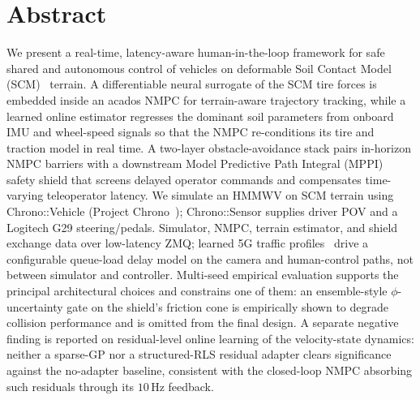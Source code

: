 \documentclass{acmd2026_abstract}
\begin{document}
\section*{Abstract}
We present a real-time, latency-aware human-in-the-loop framework
for safe shared and autonomous control of vehicles on deformable
Soil Contact Model (SCM)~\cite{Krenn09} terrain.  A differentiable
neural surrogate of the SCM tire forces is embedded inside an
acados NMPC for terrain-aware trajectory tracking, while a
learned online estimator regresses the dominant soil parameters
from onboard IMU and wheel-speed signals so that the NMPC
re-conditions its tire and traction model in real time.
A two-layer obstacle-avoidance stack pairs in-horizon NMPC barriers
with a downstream Model Predictive Path Integral (MPPI) safety
shield that screens delayed operator commands and compensates
time-varying teleoperator latency.
We simulate an HMMWV on SCM terrain using
Chrono::Vehicle (Project Chrono~\cite{Tasora16}); Chrono::Sensor
supplies driver POV and a Logitech G29 steering/pedals. Simulator,
NMPC, terrain estimator, and shield exchange data over low-latency
ZMQ; learned 5G traffic profiles~\cite{Choi23} drive a configurable
queue-load delay model on the camera and human-control paths, not
between simulator and controller. Multi-seed empirical evaluation
supports the principal architectural choices and constrains one of
them: an ensemble-style $\phi$-uncertainty gate on the shield's
friction cone is empirically shown to degrade collision performance
and is omitted from the final design. A separate negative finding is
reported on residual-level online learning of the velocity-state
dynamics: neither a sparse-GP nor a structured-RLS residual adapter
clears significance against the no-adapter baseline, consistent with
the closed-loop NMPC absorbing such residuals through its
$10\,\mathrm{Hz}$ feedback.
\end{document}
